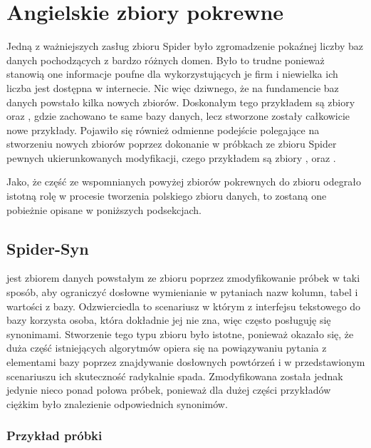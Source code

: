 \section{Angielskie zbiory pokrewne} \label{text:related-datasets}
Jedną z ważniejszych zasług zbioru Spider było zgromadzenie pokaźnej liczby baz danych pochodzących z bardzo różnych domen. Było to trudne ponieważ stanowią one informacje poufne dla wykorzystujących je firm i niewielka ich liczba jest dostępna w internecie. Nic więc dziwnego, że na fundamencie baz danych  powstało kilka nowych zbiorów. Doskonałym tego przykładem są zbiory  oraz , gdzie zachowano te same bazy danych, lecz stworzone zostały całkowicie nowe przykłady. Pojawiło się również odmienne podejście polegające na stworzeniu nowych zbiorów poprzez dokonanie w próbkach ze zbioru Spider pewnych ukierunkowanych modyfikacji, czego przykładem są zbiory ,  oraz .

Jako, że część ze wspomnianych powyżej zbiorów pokrewnych do zbioru  odegrało istotną rolę w procesie tworzenia polskiego zbioru danych, to zostaną one pobieżnie opisane w poniższych podsekcjach.

\subsection{Spider-Syn}
 jest zbiorem danych powstałym ze zbioru  poprzez zmodyfikowanie próbek w taki sposób, aby ograniczyć dosłowne wymienianie w pytaniach nazw kolumn, tabel i wartości z bazy. Odzwierciedla to scenariusz w którym z interfejsu tekstowego do bazy korzysta osoba, która dokładnie jej nie zna, więc często posługuję się synonimami. Stworzenie tego typu zbioru było istotne, ponieważ okazało się, że duża część istniejących algorytmów opiera się na powiązywaniu pytania z elementami bazy poprzez znajdywanie dosłownych powtórzeń i w przedstawionym scenariuszu ich skuteczność radykalnie spada. Zmodyfikowana została jednak jedynie nieco ponad połowa próbek, ponieważ dla dużej części przykładów ciężkim było znalezienie odpowiednich synonimów.

\subsubsection{Przykład próbki}

\begin{minipage}{\linewidth}

\end{minipage}

